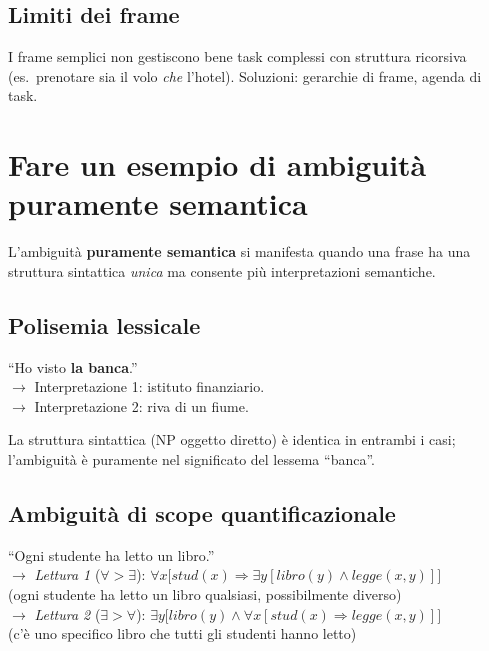 \documentclass[12pt,a4paper]{article}
\begin{document}
\subsection{Limiti dei frame}

I frame semplici non gestiscono bene task complessi con struttura ricorsiva (es.\ prenotare sia il volo \emph{che} l'hotel). Soluzioni: gerarchie di frame, agenda di task.

\section{Fare un esempio di ambiguità puramente semantica}

L'ambiguità \textbf{puramente semantica} si manifesta quando una frase ha una struttura sintattica \emph{unica} ma consente più interpretazioni semantiche.

\subsection{Polisemia lessicale}

``Ho visto \textbf{la banca}.''\\
$\to$ Interpretazione 1: istituto finanziario.\\
$\to$ Interpretazione 2: riva di un fiume.

La struttura sintattica (NP oggetto diretto) è identica in entrambi i casi; l'ambiguità è puramente nel significato del lessema ``banca''.

\subsection{Ambiguità di scope quantificazionale}

``Ogni studente ha letto un libro.''\\
$\to$ \emph{Lettura 1} ($\forall > \exists$): $\forall x\bigl[\mathit{stud}(x) \Rightarrow \exists y[\mathit{libro}(y) \wedge \mathit{legge}(x,y)]\bigr]$\\
\hspace*{1.5em}(ogni studente ha letto un libro qualsiasi, possibilmente diverso)\\
$\to$ \emph{Lettura 2} ($\exists > \forall$): $\exists y\bigl[\mathit{libro}(y) \wedge \forall x[\mathit{stud}(x) \Rightarrow \mathit{legge}(x,y)]\bigr]$\\
\hspace*{1.5em}(c'è uno specifico libro che tutti gli studenti hanno letto)
\end{document}

